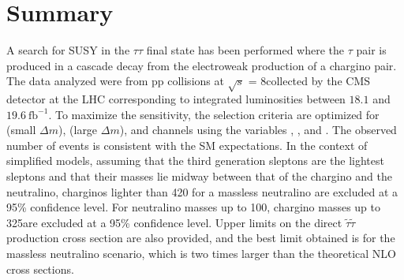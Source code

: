 \section{Summary}
\label{sect:conclusion}
A search for SUSY in the $\tau\tau$ final state has been performed where the
$\tau$ pair is produced in a cascade decay from the electroweak production of a chargino pair.  The data analyzed were from pp collisions
at $\sqrt{s}$ = 8\TeV collected by the CMS detector at the LHC corresponding to integrated luminosities between $18.1$ and $19.6~\mathrm{fb}^{-1}$. 
To maximize the sensitivity, the selection criteria are optimized for \tauTau (small $\Delta m$), 
\tauTau (large $\Delta m$), and \leptonTau channels using the variables \mttwo, \tauMT, and \SumMT.
The observed number of events is consistent with the SM expectations. 
In the context of simplified models, assuming that the third generation
sleptons are the lightest sleptons and that their masses lie midway between
that of the chargino and the neutralino, charginos lighter than 420\GeV 
for a massless neutralino are excluded at a 95\% confidence level. 
For neutralino masses up to 100\GeV, chargino masses up to 325\GeV are excluded
at a 95\% confidence level.
Upper limits on the direct $\tilde{\tau}\tilde{\tau}$ production cross section are also provided, 
and the best limit obtained is for the massless neutralino scenario, which is two times
larger than the theoretical NLO cross sections. 


